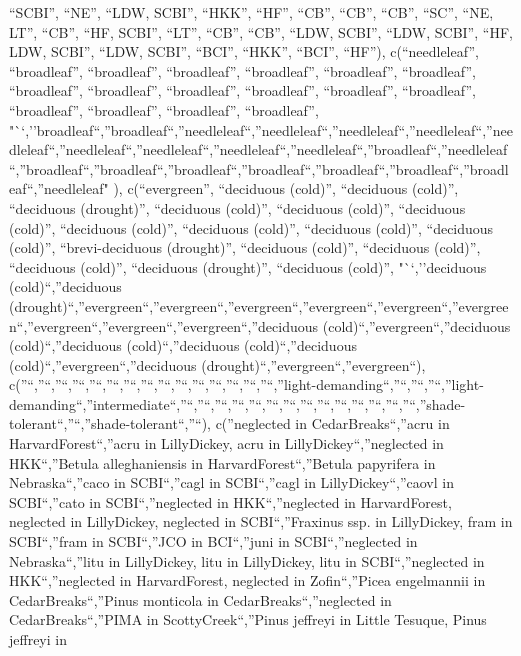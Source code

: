 \documentclass[
]{article}
\begin{document}
``SCBI'', ``NE'', ``LDW, SCBI'', ``HKK'', ``HF'', ``CB'', ``CB'',
``CB'', ``SC'', ``NE, LT'', ``CB'', ``HF, SCBI'', ``LT'', ``CB'',
``CB'', ``LDW, SCBI'', ``LDW, SCBI'', ``HF, LDW, SCBI'', ``LDW, SCBI'',
``BCI'', ``HKK'', ``BCI'', ``HF''), c(``needleleaf'', ``broadleaf'',
``broadleaf'', ``broadleaf'', ``broadleaf'', ``broadleaf'',
``broadleaf'', ``broadleaf'', ``broadleaf'', ``broadleaf'',
``broadleaf'', ``broadleaf'', ``broadleaf'', ``broadleaf'',
``broadleaf'', ``broadleaf'', ``broadleaf'',
"``,''broadleaf``,''broadleaf``,''needleleaf``,''needleleaf``,''needleleaf``,''needleleaf``,''needleleaf``,''needleleaf``,''needleleaf``,''needleleaf``,''needleleaf``,''broadleaf``,''needleleaf``,''broadleaf``,''broadleaf``,''broadleaf``,''broadleaf``,''broadleaf``,''broadleaf``,''broadleaf``,''needleleaf"
), c(``evergreen'', ``deciduous (cold)'', ``deciduous (cold)'',
``deciduous (drought)'', ``deciduous (cold)'', ``deciduous (cold)'',
``deciduous (cold)'', ``deciduous (cold)'', ``deciduous (cold)'',
``deciduous (cold)'', ``deciduous (cold)'', ``brevi-deciduous
(drought)'', ``deciduous (cold)'', ``deciduous (cold)'', ``deciduous
(cold)'', ``deciduous (drought)'', ``deciduous (cold)'', "``,''deciduous
(cold)``,''deciduous
(drought)``,''evergreen``,''evergreen``,''evergreen``,''evergreen``,''evergreen``,''evergreen``,''evergreen``,''evergreen``,''evergreen``,''deciduous
(cold)``,''evergreen``,''deciduous (cold)``,''deciduous
(cold)``,''deciduous (cold)``,''deciduous
(cold)``,''evergreen``,''deciduous
(drought)``,''evergreen``,''evergreen``),
c(''``,''``,''``,''``,''``,''``,''``,''``,''``,''``,''``,''``,''``,''``,''``,''light-demanding``,''``,''``,''``,''light-demanding``,''intermediate``,''``,''``,''``,''``,''``,''``,''``,''``,''``,''``,''``,''``,''``,''``,''shade-tolerant``,''``,''shade-tolerant``,''``),
c(''neglected in CedarBreaks``,''acru in HarvardForest``,''acru in
LillyDickey, acru in LillyDickey``,''neglected in HKK``,''Betula
alleghaniensis in HarvardForest``,''Betula papyrifera in
Nebraska``,''caco in SCBI``,''cagl in SCBI``,''cagl in
LillyDickey``,''caovl in SCBI``,''cato in SCBI``,''neglected in
HKK``,''neglected in HarvardForest, neglected in LillyDickey, neglected
in SCBI``,''Fraxinus ssp. in LillyDickey, fram in SCBI``,''fram in
SCBI``,''JCO in BCI``,''juni in SCBI``,''neglected in Nebraska``,''litu
in LillyDickey, litu in LillyDickey, litu in SCBI``,''neglected in
HKK``,''neglected in HarvardForest, neglected in Zofin``,''Picea
engelmannii in CedarBreaks``,''Pinus monticola in
CedarBreaks``,''neglected in CedarBreaks``,''PIMA in
ScottyCreek``,''Pinus jeffreyi in Little Tesuque, Pinus jeffreyi in
\end{document}
